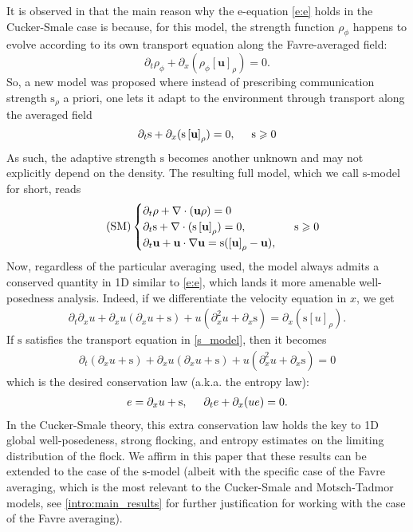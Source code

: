 \documentclass[11pt,letterpaper]{amsart}
\theoremstyle{plain}
\theoremstyle{definition}
\theoremstyle{remark}
\newcommand{\ave}[1]{ \left[ #1 \right]}
\renewcommand{\geq}{\geqslant}
\def\u{\textbf{u}}
\def \st {\mathrm{s}}
\begin{document}
It is observed  in  \cite{shvydkoy2022environmental} that the main reason why the e-equation \eqref{e:e} holds in the Cucker-Smale case is because, for this model, the strength function $\rho_{\phi}$ happens to evolve according to its own transport equation along the Favre-averaged field:
\begin{equation}\label{ }
\partial_t \rho_\phi + \partial_x ( \rho_\phi \ave{\u}_\rho ) = 0.
\end{equation}
So, a new model was proposed where instead of prescribing communication strength $\st_\rho$ a priori, one lets it adapt to the environment through transport along the averaged field
\begin{equation}\label{ }
\partial_t \st + \partial_x ( \st \ave{\u}_\rho) = 0, \hspace{5mm} \st \geq 0 
\end{equation}
As such, the adaptive strength $\st$ becomes another unknown and may not explicitly depend on the density. The resulting full model, which we call $\st$-model for short, reads
\begin{equation}
    \label{s_model}
    \tag{SM}
    \begin{cases}
        \partial_t \rho + \nabla \cdot (\u\rho) = 0 \\
        \partial_t \st + \nabla \cdot (\st \ave{\u}_{\rho}) = 0,  \hspace{15mm} \st \geq 0   \\
        \partial_t \u + \u \cdot \nabla \u = \st (\ave{\u}_{\rho} - \u),
    \end{cases}
\end{equation}
Now, regardless of the particular averaging used, the model always admits a conserved 
quantity in 1D similar to \eqref{e:e}, which lands it more amenable well-posedness analysis.   
Indeed, if we differentiate the velocity equation in $x$, we get 
\begin{align*}
    \partial_t \partial_x u + \partial_x u (\partial_x u + \st) + u(\partial_x^2 u + \partial_x \st) = \partial_x (\st [u]_{\rho}) .
\end{align*} 
If $\st$ satisfies the transport equation in \eqref{s_model}, then it becomes 
\begin{align*}
    \partial_t (\partial_x u + \st) + \partial_x u (\partial_x u + \st) + u(\partial_x^2 u + \partial_x \st) = 0
\end{align*} 
which is the desired conservation law (a.k.a. the entropy law):  
\begin{align}
    \label{conservation_law}
    e = \partial_x u + \st, \hspace{5mm} \partial_t e + \partial_x (ue) = 0.
\end{align}
In the Cucker-Smale theory, this extra conservation law holds the key to 1D global well-posedeness, strong flocking, and 
entropy estimates on the limiting distribution of the flock.  We affirm in this paper that these results can be extended to the case 
of the $\st$-model (albeit with the specific case of the Favre averaging, which is the most relevant to the Cucker-Smale and Motsch-Tadmor models,
see \ref{intro:main_results} for further justification for working with the case of the Favre averaging). 
\end{document}

